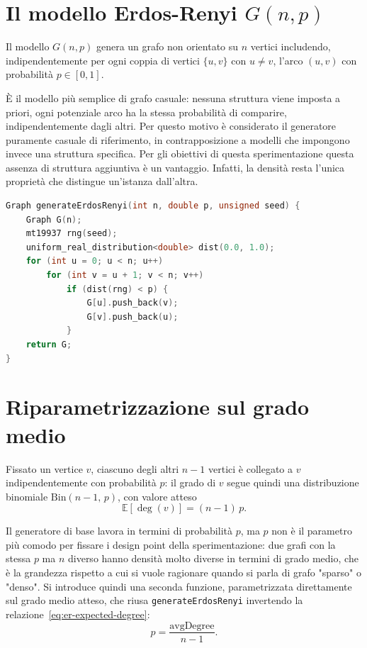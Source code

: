 \section{Il modello Erdos-Renyi $G(n,p)$}

\begin{definiz}
Il modello $G(n,p)$ genera un grafo non orientato su $n$ vertici includendo, indipendentemente per ogni coppia di vertici $\{u,v\}$ con $u \neq v$, l'arco $(u,v)$ con probabilità $p \in [0,1]$.
\end{definiz}

È il modello più semplice di grafo casuale: nessuna struttura viene imposta a priori, ogni potenziale arco ha la stessa probabilità di comparire, indipendentemente dagli altri. Per questo motivo è considerato il generatore puramente casuale di riferimento, in contrapposizione a modelli che impongono invece una struttura specifica. 
Per gli obiettivi di questa sperimentazione  questa assenza di struttura aggiuntiva è un vantaggio. Infatti, la densità resta l'unica proprietà che distingue un'istanza dall'altra.

\begin{lstlisting}[language=C++, caption={Generatore Erdos-Renyi (\texttt{data/utils.cpp})}]
Graph generateErdosRenyi(int n, double p, unsigned seed) {
    Graph G(n);
    mt19937 rng(seed);
    uniform_real_distribution<double> dist(0.0, 1.0);
    for (int u = 0; u < n; u++)
        for (int v = u + 1; v < n; v++)
            if (dist(rng) < p) {
                G[u].push_back(v);
                G[v].push_back(u);
            }
    return G;
}
\end{lstlisting}

\section{Riparametrizzazione sul grado medio}
Fissato un vertice $v$, ciascuno degli altri $n-1$ vertici è collegato a $v$ indipendentemente con probabilità $p$: il grado di $v$ segue quindi una distribuzione binomiale $\mathrm{Bin}(n-1,\,p)$, con valore atteso
\begin{equation}
    \mathbb{E}[\deg(v)] = (n-1)\,p.
    \label{eq:er-expected-degree}
\end{equation}

Il generatore di base lavora in termini di probabilità $p$, ma $p$ non è il parametro più comodo per fissare i design point della sperimentazione: due grafi con la stessa $p$ ma $n$ diverso hanno densità molto diverse in termini di grado medio, che è la grandezza rispetto a cui si vuole ragionare quando si parla di grafo "sparso" o "denso". Si introduce quindi una seconda funzione, parametrizzata direttamente sul grado medio atteso, che riusa \texttt{generateErdosRenyi} invertendo la relazione~\eqref{eq:er-expected-degree}:
\begin{equation}
    p = \frac{\text{avgDegree}}{n-1}.
    \label{eq:er-p-from-avgdegree}
\end{equation}

